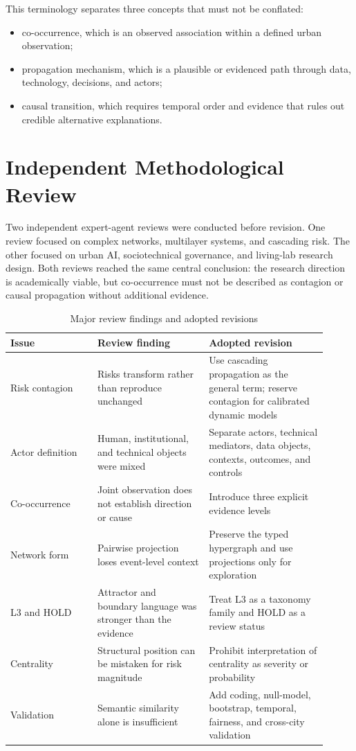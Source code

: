 \documentclass[11pt,a4paper]{article}
\begin{document}
This terminology separates three concepts that must not be conflated:
\begin{itemize}
  \item co-occurrence, which is an observed association within a defined urban observation;
  \item propagation mechanism, which is a plausible or evidenced path through data, technology, decisions, and actors;
  \item causal transition, which requires temporal order and evidence that rules out credible alternative explanations.
\end{itemize}

\section{Independent Methodological Review}

Two independent expert-agent reviews were conducted before revision. One review focused on complex networks, multilayer systems, and cascading risk. The other focused on urban AI, sociotechnical governance, and living-lab research design. Both reviews reached the same central conclusion: the research direction is academically viable, but co-occurrence must not be described as contagion or causal propagation without additional evidence.

\begin{table}[h]
\centering
\caption{Major review findings and adopted revisions}
\begin{tabular}{p{0.25\linewidth}p{0.32\linewidth}p{0.34\linewidth}}
\toprule
Issue & Review finding & Adopted revision \\
\midrule
Risk contagion & Risks transform rather than reproduce unchanged & Use cascading propagation as the general term; reserve contagion for calibrated dynamic models \\
Actor definition & Human, institutional, and technical objects were mixed & Separate actors, technical mediators, data objects, contexts, outcomes, and controls \\
Co-occurrence & Joint observation does not establish direction or cause & Introduce three explicit evidence levels \\
Network form & Pairwise projection loses event-level context & Preserve the typed hypergraph and use projections only for exploration \\
L3 and HOLD & Attractor and boundary language was stronger than the evidence & Treat L3 as a taxonomy family and HOLD as a review status \\
Centrality & Structural position can be mistaken for risk magnitude & Prohibit interpretation of centrality as severity or probability \\
Validation & Semantic similarity alone is insufficient & Add coding, null-model, bootstrap, temporal, fairness, and cross-city validation \\
\bottomrule
\end{tabular}
\end{table}
\end{document}
